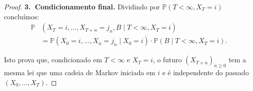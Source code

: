 \documentclass[12pt,letterpaper]{article}
\begin{document}
\begin{proof}
\medskip

\noindent\textbf{3.~Condicionamento final.}  
Dividindo por $\mathbb{P}(T<\infty, X_T=i)$ concluímos:
\begin{align*}
\mathbb{P} & (X_T=i,\dots,X_{T+n}=j_n, B \mid T<\infty, X_T=i) 
\\  & = \mathbb{P}(X_0=i,\dots,X_n=j_n\mid X_0=i)\cdot \mathbb{P}(B \mid T<\infty, X_T=i).
\end{align*}


Isto prova que, condicionado em $T < \infty$ e $X_T = i$, o futuro
$(X_{T+n})_{n \geq 0}$ tem a mesma lei que uma cadeia de Markov
iniciada em $i$ e é independente do passado $(X_0,\dots,X_T)$.
\end{proof}
\end{document}
